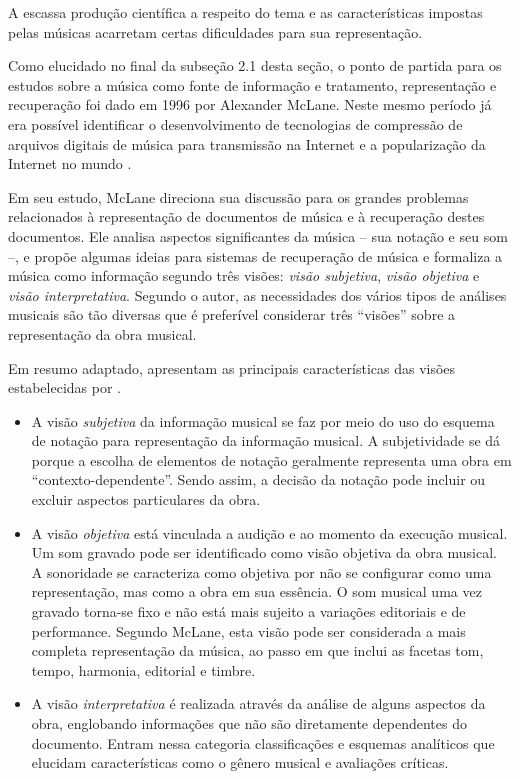 A escassa produção científica a respeito do tema e as características impostas pelas músicas acarretam certas dificuldades para sua representação.

Como elucidado no final da subseção 2.1 desta seção, o ponto de partida para os estudos sobre a música como fonte de informação e tratamento, representação e recuperação foi dado em 1996 por Alexander McLane. Neste mesmo período já era possível identificar o desenvolvimento de tecnologias de compressão de arquivos digitais de música para transmissão na Internet e a popularização da Internet no mundo \cite{santini&souza2007}.

Em seu estudo, McLane direciona sua discussão para os grandes problemas relacionados à representação de documentos de música e à recuperação destes documentos. Ele analisa aspectos significantes da música – sua notação e seu som –, e propõe algumas ideias para sistemas de recuperação de música e formaliza a música como informação segundo três visões: \textit{visão subjetiva}, \textit{visão objetiva} e \textit{visão interpretativa}. Segundo o autor, as necessidades dos vários tipos de análises musicais são tão diversas que é preferível considerar três “visões” sobre a representação da obra musical.

Em resumo adaptado,  apresentam as principais características das visões estabelecidas por .

\begin{itemize}
    \item A visão \textit{subjetiva} da informação musical se faz por meio do uso do esquema de notação para representação da informação musical. A subjetividade se dá porque a escolha de elementos de notação geralmente representa uma obra em “contexto-dependente”. Sendo assim, a decisão da notação pode incluir ou excluir aspectos particulares da obra.
    \item A visão \textit{objetiva} está vinculada a audição e ao momento da execução musical. Um som gravado pode ser identificado como visão objetiva da obra musical. A sonoridade se caracteriza como objetiva por não se configurar como uma representação, mas como a obra em sua essência. O som musical uma vez gravado torna-se fixo e não está mais sujeito a variações editoriais e de performance. Segundo McLane, esta visão pode ser considerada a mais completa representação da música, ao passo em que inclui as facetas tom, tempo, harmonia, editorial e timbre.
    \item A visão \textit{interpretativa} é realizada através da análise de alguns aspectos da obra, englobando informações que não são diretamente dependentes do documento. Entram nessa categoria classificações e esquemas analíticos que elucidam características como o gênero musical e avaliações críticas.
\end{itemize}

